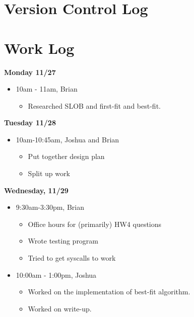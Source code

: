\documentclass[letterpaper, onecolumn, draftclsnofoot, 10pt, compsoc]{IEEEtran}
\begin{document}
\section{Version Control Log}
    
    
\section{Work Log}
    \begin{singlespace}
        \textbf{Monday 11/27}
            \begin{itemize}
                \item 10am - 11am, Brian 
                \begin{itemize}
                    \item Researched SLOB and first-fit and best-fit.
                \end{itemize}
            \end{itemize}
        \textbf{Tuesday 11/28}
            \begin{itemize}
                \item 10am-10:45am, Joshua and Brian 
                \begin{itemize}
                    \item Put together design plan
                    \item Split up work
                \end{itemize}
            \end{itemize}
        \textbf{Wednesday, 11/29}
            \begin{itemize}
                \item 9:30am-3:30pm, Brian
                \begin{itemize}
                    \item Office hours for (primarily) HW4 questions 
                    \item Wrote testing program
                    \item Tried to get syscalls to work
                \end{itemize}
                \item 10:00am - 1:00pm, Joshua
                \begin{itemize}
                    \item Worked on the implementation of best-fit algorithm.
                    \item Worked on write-up.
                \end{itemize}

\end{itemize}
\end{singlespace}
\end{document}

